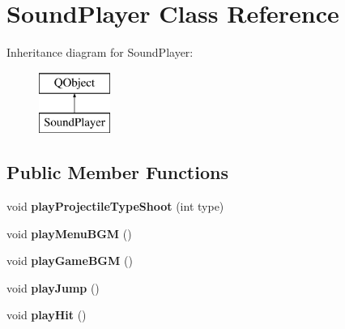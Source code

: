 \hypertarget{class_sound_player}{}\section{Sound\+Player Class Reference}
\label{class_sound_player}
Inheritance diagram for Sound\+Player\+:\begin{figure}[H]
\begin{center}
\leavevmode
\includegraphics[height=2.000000cm]{class_sound_player}
\end{center}
\end{figure}
\subsection*{Public Member Functions}
\begin{DoxyCompactItemize}
\item 
void {\bfseries play\+Projectile\+Type\+Shoot} (int type)\hypertarget{class_sound_player_a22e1a489bbbb6cfcab3662c41f8168bc}{}\label{class_sound_player_a22e1a489bbbb6cfcab3662c41f8168bc}

\item 
void {\bfseries play\+Menu\+B\+GM} ()\hypertarget{class_sound_player_afcffc7d0a0437906496aff6ea1669193}{}\label{class_sound_player_afcffc7d0a0437906496aff6ea1669193}

\item 
void {\bfseries play\+Game\+B\+GM} ()\hypertarget{class_sound_player_a896f537cc0518edc7a724554ec35cf27}{}\label{class_sound_player_a896f537cc0518edc7a724554ec35cf27}

\item 
void {\bfseries play\+Jump} ()\hypertarget{class_sound_player_a854749ef29c5620f8b3b6355b7015d01}{}\label{class_sound_player_a854749ef29c5620f8b3b6355b7015d01}

\item 
void {\bfseries play\+Hit} ()\hypertarget{class_sound_player_a620011ab815ca67880615766518e3157}{}\label{class_sound_player_a620011ab815ca67880615766518e3157}

\end{DoxyCompactItemize}
